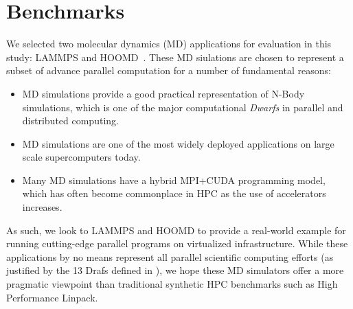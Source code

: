 



\section{Benchmarks}
We selected two molecular dynamics (MD) applications for evaluation in this study:
LAMMPS and HOOMD~\cite{plimpton2007lammps,anderson2010hoomd}.  These MD siulations are chosen to represent a subset of advance parallel computation for a number of fundamental reasons:

\begin{itemize}
\item MD simulations provide a good practical representation of N-Body simulations, which is one of the major computational \emph{Dwarfs} \cite{asanovic2006landscape} in parallel and distributed computing. 
\item MD simulations are one of the most widely deployed applications on large scale supercomputers today.
\item Many MD simulations have a hybrid MPI+CUDA programming model, which has often become commonplace in HPC as the use of accelerators increases.
\end{itemize}

As such, we look to LAMMPS and HOOMD to provide a real-world example for running cutting-edge parallel programs on virtualized infrastructure. While these applications by no means represent all parallel scientific computing efforts (as justified by the 13 Drafs defined in \cite{asanovic2006landscape}), we hope these MD simulators offer a more pragmatic viewpoint than traditional synthetic HPC benchmarks such as High Performance Linpack. 


